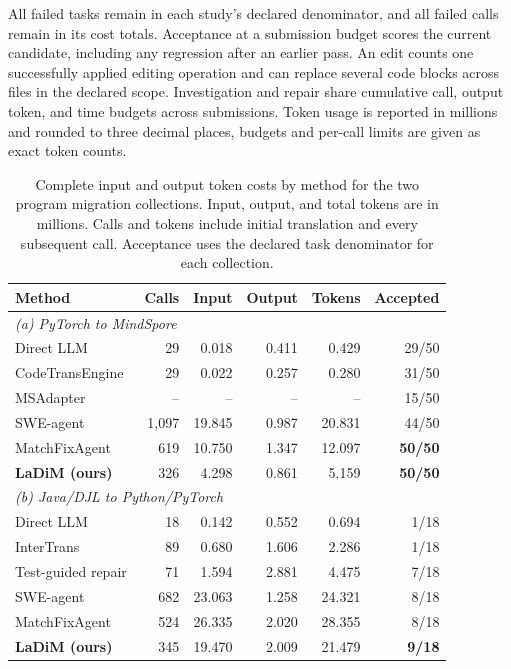 \documentclass{article}
\begin{document}
All failed tasks remain in each study's declared denominator, and all failed calls remain in its cost totals. Acceptance at a submission budget scores the current candidate, including any regression after an earlier pass. An edit counts one successfully applied editing operation and can replace several code blocks across files in the declared scope. Investigation and repair share cumulative call, output token, and time budgets across submissions. Token usage is reported in millions and rounded to three decimal places, budgets and per-call limits are given as exact token counts.
\begin{table}[!htb]
\caption{Complete input and output token costs by method for the two program migration collections. Input, output, and total tokens are in millions. Calls and tokens include initial translation and every subsequent call. Acceptance uses the declared task denominator for each collection.}
\label{tab:program-costs}
\centering
\small
\setlength{\tabcolsep}{3pt}

\begin{tabular*}{\linewidth}{@{\extracolsep{\fill}}lrrrrr@{}}
\toprule
\textbf{Method} & \textbf{Calls} & \textbf{Input} & \textbf{Output} & \textbf{Tokens} & \textbf{Accepted} \\
\midrule
\multicolumn{6}{l}{\textit{(a) PyTorch to MindSpore}} \\
Direct LLM & 29 & 0.018 & 0.411 & 0.429 & 29/50 \\
CodeTransEngine~\citep{macedo2025codetransengine} & 29 & 0.022 & 0.257 & 0.280 & 31/50 \\
MSAdapter~\citep{openi2025msadapter} & -- & -- & -- & -- & 15/50 \\
SWE-agent~\citep{yang2024sweagent} & 1,097 & 19.845 & 0.987 & 20.831 & 44/50 \\
MatchFixAgent~\citep{ibrahimzada2025matchfixagent} & 619 & 10.750 & 1.347 & 12.097 & \textbf{50/50} \\
\textbf{LaDiM (ours)} & 326 & 4.298 & 0.861 & 5.159 & \textbf{50/50} \\
\midrule
\multicolumn{6}{l}{\textit{(b) Java/DJL to Python/PyTorch}} \\
Direct LLM & 18 & 0.142 & 0.552 & 0.694 & 1/18 \\
InterTrans~\citep{macedo2024intertrans} & 89 & 0.680 & 1.606 & 2.286 & 1/18 \\
Test-guided repair & 71 & 1.594 & 2.881 & 4.475 & 7/18 \\
SWE-agent & 682 & 23.063 & 1.258 & 24.321 & 8/18 \\
MatchFixAgent & 524 & 26.335 & 2.020 & 28.355 & 8/18 \\
\textbf{LaDiM (ours)} & 345 & 19.470 & 2.009 & 21.479 & \textbf{9/18} \\
\bottomrule
\end{tabular*}


\end{table}
\end{document}

